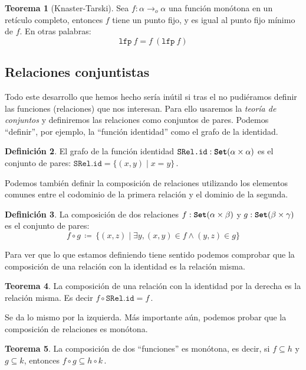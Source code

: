 \documentclass[
  a4paper, 
  10pt, 
  parskip=half, 
  toc=bibliography,
]{scrbook}
\theoremstyle{definition}
\theoremstyle{bolddef}
\newtheorem{theorem}{Teorema}[section]
\newtheorem{definition}[theorem]{Definición}
\newcommand{\funfont}[1]{\texttt{#1}}
\newcommand{\tyfont}[1]{\texttt{\textbf{#1}}}
\begin{document}
\begin{theorem}[Knaster-Tarski]\label{thm:lfp_eq}
  Sea \(f: \alpha \to_o \alpha\) una función monótona en un retículo completo,
  entonces \(f\) tiene un punto fijo, y es igual al punto fijo mínimo
  de \(f\). En otras palabras:
  \[
    \funfont{lfp} \ f = f \ (\funfont{lfp} \ f)
  \]
\end{theorem}

\subsection{Relaciones conjuntistas}

Todo este desarrollo que hemos hecho sería inútil si tras el no pudiéramos definir las 
funciones (relaciones) que nos interesan. Para ello usaremos la
\emph{teoría de conjuntos} y definiremos las relaciones como conjuntos de pares.
Podemos \enquote{definir}, por ejemplo, la \enquote{función identidad} como el grafo
de la identidad.

\begin{definition}
  El grafo de la función identidad \(\funfont{SRel.id}: \tyfont{Set} (\alpha \times \alpha)\) es el
  conjunto de pares: \(\funfont{SRel.id} = \{(x, y) \mid x = y\}\,\).
\end{definition}

Podemos también definir la composición de relaciones utilizando los elementos
comunes entre el codominio de la primera relación y el dominio de la segunda.

\begin{definition}
  La composición de dos relaciones \(f: \tyfont{Set} (\alpha \times \beta)\) y \(g: \tyfont{Set} (\beta \times \gamma)\)
  es el conjunto de pares:
  \[
    f \circ g \, \coloneqq \, \{(x, z) \mid \exists y, (x, y) \in f \land (y, z) \in g\}
  \]
\end{definition}

Para ver que lo que estamos definiendo tiene sentido podemos comprobar que
la composición de una relación con la identidad es la relación misma.

\begin{theorem}
  La composición de una relación con la identidad por la derecha es la relación misma.
  Es decir \(f \circ \funfont{SRel.id} = f\,\).
\end{theorem}

Se da lo mismo por la izquierda. Más importante aún, podemos probar que la composición
de relaciones es monótona.

\begin{theorem}\label{thm:rel_comp_monotone}
  La composición de dos \enquote{funciones} es monótona, es decir, si \(f \subseteq h\) y
  \(g \subseteq k\), entonces \(f \circ g \subseteq h \circ k\,\).
\end{theorem}
\end{document}
